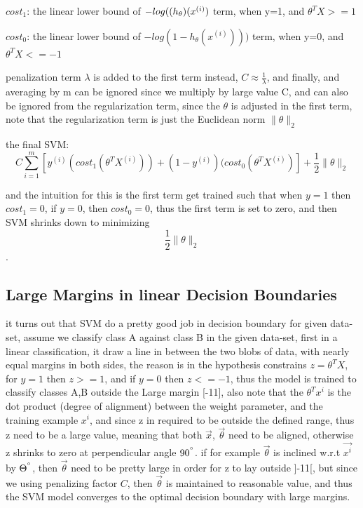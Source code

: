 \documentclass[4apaper,12pt]{book}
\begin{document}
\begin{description}
  \item $cost_1$: the linear lower bound of $-log(\text( h_{\theta})(x^{(i)})$ term, when y=1, and $\theta^TX>=1$
  \item $cost_0$: the linear lower bound of $-log(1-h_{\theta}(x^{(i)})))$ term, when y=0, and $\theta^TX<=-1$
  \item penalization term $\lambda$ is added to the first term instead,  $C \approx \frac{1}{\lambda}$, and finally, and averaging by m can be ignored since we multiply by large value C, and can also be ignored from the regularization term, since the $\theta$ is adjusted in the first term, note that the regularization term is just the Euclidean norm $\lVert \theta \rVert_2$
  \item the final SVM: $$C\sum_{i=1}^m[y^{(i)}(cost_1(\theta^TX^{(i)})) + (1-y^{(i)}) (cost_0(\theta^TX^{(i)})] + \frac{1}{2} \lVert \theta \rVert_2$$
  \item and the intuition for this is the first term get trained such that when $y=1$ then $cost_1=0$, if $y=0$, then $cost_0=0$, thus the first term is set to zero, and then SVM shrinks down to minimizing $$\frac{1}{2} \lVert \theta \rVert_2$$.
    \subsection{Large Margins in linear Decision Boundaries}
    \begin{description}
    \item it turns out that SVM do a pretty good job in decision boundary for given data-set, assume we classify class A against class B in the given data-set, first in a linear classification, it draw a line in between the two blobs of data, with nearly equal margins in both sides, the reason is in the hypothesis constrains $z=\theta^TX$, for $y=1$ then $z>=1$, and if $y=0$ then $z<=-1$, thus the model is trained to classify classes A,B outside the Large margin [-1\text{-}1], also note that the $\theta^Tx^i$ is the dot product (degree of alignment) between the weight parameter, and the training example $x^i$, and since z in required to be outside the defined range, thus z need to be a large value, meaning that both $\vec{x}$, $\vec{\theta}$ need to be aligned, otherwise z shrinks to zero at perpendicular angle $90^{\degree}$. if for example $\vec{\theta}$ is inclined w.r.t $\vec{x^{i}}$ by $\Theta^{\degree}$, then $\vec{\theta}$ need to be pretty large in order for z to lay outside ]-1\text{-}1[, but since we using penalizing factor $C$, then $\vec{\theta}$ is maintained to reasonable value, and thus the SVM model converges to the optimal decision boundary with large margins.
    \end{description}

\end{description}
\end{document}
